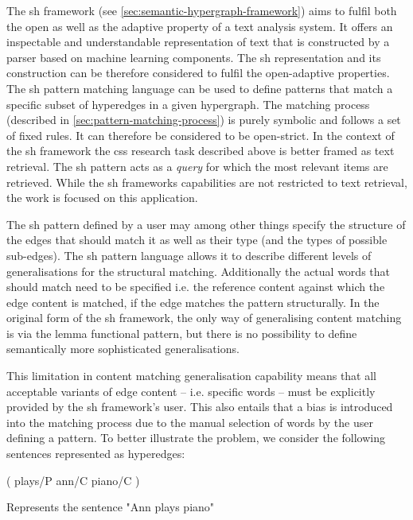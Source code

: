 \documentclass[11pt]{scrreprt}
\begin{document}
The \gls{sh} framework (see \cref{sec:semantic-hypergraph-framework}) aims to fulfil both the open as well as the adaptive property of a text analysis system. It offers an inspectable and understandable representation of text that is constructed by a parser based on machine learning components. The \gls{sh} representation and its construction can be therefore considered to fulfil the open-adaptive properties. The \gls{sh} pattern matching language can be used to define patterns that match a specific subset of hyperedges in a given hypergraph. The matching process (described in \cref{sec:pattern-matching-process}) is purely symbolic and follows a set of fixed rules. It can therefore be considered to be open-strict. In the context of the \gls{sh} framework the \gls{css} research task described above is better framed as text retrieval. The \gls{sh} pattern acts  as a \textit{query} for which the most relevant items are retrieved. While the \gls{sh} frameworks capabilities are not restricted to text retrieval, the work is focused on this application.

The \gls{sh} pattern defined by a user may among other things specify the structure of the edges that should match it as well as their type (and the types of possible sub-edges). The \gls{sh} pattern language allows it to describe different levels of generalisations for the structural matching. Additionally the actual words that should match need to be specified i.e. the reference content against which the edge content is matched, if the edge matches the pattern structurally. In the original form of the \gls{sh} framework, the only way of generalising content matching is via the lemma functional pattern, but there is no possibility to define semantically more sophisticated generalisations.

This limitation in content matching generalisation capability means that all acceptable variants of edge content -- i.e. specific words -- must be explicitly provided by the \gls{sh} framework's user. This also entails that a bias is introduced into the matching process due to the manual selection of words by the user defining a pattern. To better illustrate the problem, we consider the following sentences represented as hyperedges:

\begin{hedge}[h!]
  \normalfont\sffamily
  \centering
  ( plays/P ann/C piano/C ) 
  \caption{Represents the sentence "Ann plays piano"}
  \label{hed:ann-plays-piano}
\end{hedge}
\end{document}
